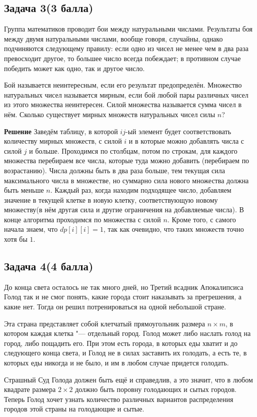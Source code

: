 \documentclass[a4paper, 12pt]{article}
\theoremstyle{plain}
\theoremstyle{definition}
\theoremstyle{remark}
\begin{document}
\subsection{Задача 3(3 балла)}
Группа математиков проводит бои между натуральными числами. Результаты боя между двумя натуральными числами, вообще говоря, случайны, однако подчиняются следующему правилу: если одно из чисел не менее чем в два раза превосходит другое, то большее число всегда побеждает; в противном случае победить может как одно, так и другое число.

Бой называется неинтересным, если его результат предопределён. Множество натуральных чисел называется мирным, если бой любой пары различных чисел из этого множества неинтересен. Силой множества называется сумма чисел в нём. Сколько существует мирных множеств натуральных чисел силы $n$?

\textbf{Решение} Заведём таблицу, в которой $ij$-ый элемент будет соответствовать количеству мирных
множеств, с силой $i$ и в которые можно добавлять числа с силой $j$ и больше.
Проходимся по столбцам, потом по строкам, для каждого множества перебираем все
числа, которые туда можно добавить (перебираем по возрастанию). Числа должны
быть в два раза больше, тем текущая сила максимального числа в множестве, но
суммарно сила нового множества должна быть меньше $n$. Каждый раз, когда находим
подходящее число, добавляем значение в текущей клетке в новую клетку,
соответствующую новому множеству(в нём другая сила и другие ограничения на
добавляемые числа). В конце алгоритма проходимся по множества с
силой $n$. Кроме того, с самого начала знаем, что $dp[i][i]=1$, так как
очевидно, что таких множеств точно хотя бы $1$.
\subsection{Задача 4(4 балла)}
До конца света осталось не так много дней, но Третий всадник Апокалипсиса Голод так и не смог понять, какие города стоит наказывать за прегрешения, а какие нет. Тогда он решил потренироваться на одной небольшой стране.

Эта страна представляет собой клетчатый прямоугольник размера $n\times m$, в котором каждая клетка "--- отдельный город. Голод может либо наслать голод на город, либо пощадить его. При этом есть города, в которых еды хватит и до следующего конца света, и Голод не в силах заставить их голодать, а есть те, в которых еды никогда и не было, и им в любом случае придется голодать.

Страшный Суд Голода должен быть ещё и справедлив, а это значит, что в любом квадрате размера $2\times2$ должно быть поровну голодающих и сытых городов. Теперь Голод хочет узнать количество различных вариантов распределения городов этой страны на голодающие и сытые.
\end{document}
